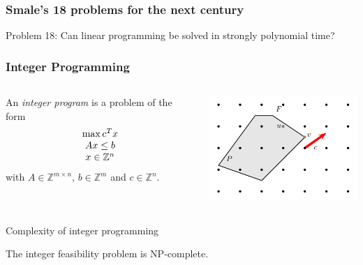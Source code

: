 \begin{frame}
  

\end{frame}


\begin{frame}
  \frametitle{Smale's 18 problems for the next century }
  Problem 18: Can linear programming be solved in strongly polynomial time? 
\end{frame}

\begin{frame}
  \frametitle{Integer Programming}

  \begin{columns}
    \begin{column}{.3\textwidth}
      An \emph{integer program} is a problem of the form 
\begin{displaymath}
  \begin{array}{c}
    \max c^Tx \\
    Ax\leq b \\
    x \in \mathbb{Z}^n 
  \end{array}
\end{displaymath}
with $A ∈ ℤ^{m ×n}$, $b ∈ ℤ^{m}$ and $c ∈ ℤ^n$. 
    \end{column}
    \begin{column}{.7\textwidth}
      
  \begin{center}
   \includegraphics[height=4cm]{../figures/IntProg1.pdf}
  \end{center}

    \end{column}       
  \end{columns}

\end{frame}



\begin{frame}{Complexity of integer programming} 

  \begin{theorem}
    The integer feasibility problem is NP-complete. 
  \end{theorem}
  
\end{frame}



